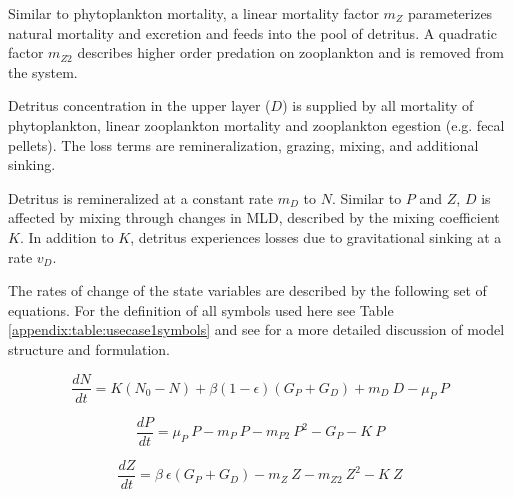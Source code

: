 \documentclass[journal abbreviation, manuscript]{copernicus}
\begin{document}
Similar to phytoplankton mortality, a linear mortality factor $m_Z$ parameterizes natural mortality and excretion and feeds into the pool of detritus. A quadratic factor $m_{Z2}$ describes higher order predation on zooplankton and is removed from the system. 

Detritus concentration in the upper layer ($D$) is supplied by all mortality of phytoplankton, linear zooplankton mortality and zooplankton egestion (e.g. fecal pellets). The loss terms are remineralization, grazing, mixing, and additional sinking. 

Detritus is remineralized at a constant rate $m_D$ to $N$. Similar to $P$ and $Z$, $D$ is affected by mixing through changes in MLD, described by the mixing coefficient $K$. In addition to $K$, detritus experiences losses due to gravitational sinking at a rate $v_D$. 

The rates of change of the state variables are described by the following set of equations. For the definition of all symbols used here see Table \ref{appendix:table:usecase1symbols} and see \citet{Anderson2015c} for a more detailed discussion of model structure and formulation.

\begin{equation}
    \frac{d N}{d t} = 
    K (N_0 - N) %
    + \beta(1 - \epsilon)(G_P + G_D) %
    + m_D \ D %
    - \mu_{P} \ P %
\end{equation}

\begin{equation}
    \frac{d P}{d t} =
    \mu_{P} \ P  %
    - m_P \ P %
    - m_{P2} \ P^2 %
    - G_P %
    - K \ P %
\end{equation}

\begin{equation}
    \frac{d Z}{d t} =
    \beta \ \epsilon(G_P + G_D) %
    - m_Z \ Z %
    - m_{Z2} \ Z^2 %
    - K \ Z %
\end{equation}
\end{document}
